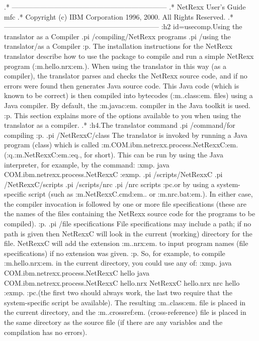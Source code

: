 .* ------------------------------------------------------------------
.* NetRexx User's Guide                                              mfc
.* Copyright (c) IBM Corporation 1996, 2000.  All Rights Reserved.
.* ------------------------------------------------------------------
:h2 id=usecomp.Using the translator as a Compiler
.pi /compiling/NetRexx programs
.pi /using the translator/as a Compiler
:p.
The installation instructions for the NetRexx translator describe how to
use the package to compile and run a simple NetRexx program
(:m.hello.nrx:em.).  When using the translator in this way (as a
compiler), the translator parses and checks the NetRexx source code, and
if no errors were found then generates Java source code.  This Java code
(which is known to be correct) is then compiled into bytecodes
(:m..class:em. files) using a Java compiler.  By default,
the :m.javac:em. compiler in the Java toolkit is used.
:p.
This section explains more of the options available to you when using
the translator as a compiler.
.*
:h4.The translator command
.pi /command/for compiling
:p.
.pi /NetRexxC/class
The translator is invoked by running a Java program (class) which is
called :m.COM.ibm.netrexx.process.NetRexxC:em. (:q.:m.NetRexxC:em.:eq.,
for short).  This can be run by using the Java interpreter, for example,
by the command:
:xmp.
java COM.ibm.netrexx.process.NetRexxC
:exmp.
.pi /scripts/NetRexxC
.pi /NetRexxC/scripts
.pi /scripts/nrc
.pi /nrc scripts
:pc.or by using a system-specific script (such as :m.NetRexxC.cmd:em..
or :m.nrc.bat:em.).  In either case, the compiler invocation is followed
by one or more file specifications (these are the names of the files
containing the NetRexx source code for the programs to be compiled).
:p.
.pi /file specifications
File specifications may include a path; if no path is given then
NetRexxC will look in the current (working) directory for the file.
NetRexxC will add the extension :m..nrx:em. to input program names (file
specifications) if no extension was given.
:p.
So, for example, to compile :m.hello.nrx:em. in the current directory,
you could use any of:
:xmp.
java COM.ibm.netrexx.process.NetRexxC hello
java COM.ibm.netrexx.process.NetRexxC hello.nrx
NetRexxC hello.nrx
nrc hello
:exmp.
:pc.(the first two should always work, the last two require that the
system-specific script be available).  The resulting :m..class:em. file
is placed in the current directory, and the :m..crossref:em.
(cross-reference) file is placed in the same directory as the source
file (if there are any variables and the compilation has no errors).
